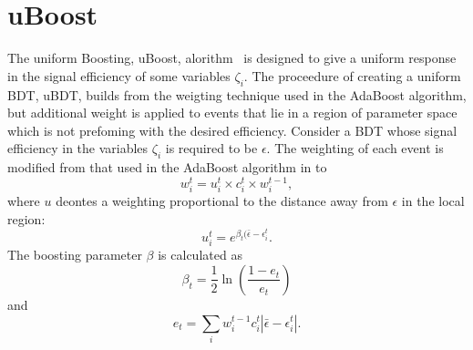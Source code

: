 

\section{uBoost}
\label{sec:bdt:uboost}
The uniform Boosting, uBoost, alorithm~\cite{Stevens:2013dya} is designed to give a uniform
response in the signal efficiency of some variables $\zeta_i$.
The proceedure of creating a uniform BDT, uBDT, builds from the weigting technique used in the
AdaBoost algorithm, but additional weight is applied to events that lie in a region of parameter
space which is not prefoming with the desired efficiency.
Consider a BDT whose signal efficiency in the variables $\zeta_i$ is required to be $\epsilon$.
The weighting of each event is modified from that used in the AdaBoost algorithm in 
to
\begin{equation}
  w_i^t = u_i^t\times c_i^t \times w_i^{t-1},
\end{equation}
where $u$ deontes a weighting proportional to the distance away from $\epsilon$ in the local
region:
\begin{equation}
  u_i^t = e^{\beta_t(\bar\epsilon-\epsilon_i^t}.
\end{equation}
The boosting parameter $\beta$ is calculated as
\begin{equation}
  \beta_t = \frac12\ln\left(\frac{1-e_t}{e_t}\right)
\end{equation}
and
\begin{equation}
  e_t = \sum_i w_i^{t-1}c_i^t\left|\bar\epsilon-\epsilon_i^t\right|.
\end{equation}

